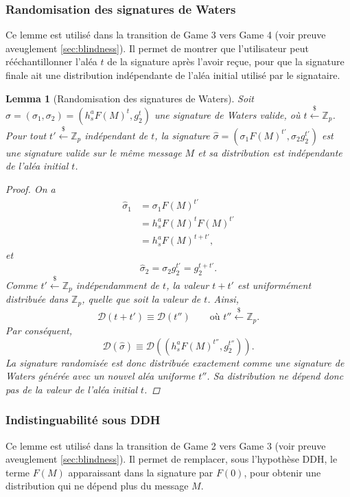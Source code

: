 \documentclass[10pt,a4paper]{article}
\theoremstyle{definition}
\theoremstyle{plain}
\newtheorem{lemma}[definition]{Lemma}
\theoremstyle{remark}
\newcommand{\sample}{\xleftarrow{\$}}
\begin{document}
\subsubsection{Randomisation des signatures de Waters}
Ce lemme est utilisé dans la transition de Game 3 vers Game 4 (voir preuve aveuglement \ref{sec:blindness}). 
Il permet de montrer que l'utilisateur peut rééchantillonner l'aléa $t$ de la signature après l'avoir reçue, 
pour que la signature finale ait une distribution indépendante de l'aléa initial utilisé par le signataire.

\begin{lemma}[Randomisation des signatures de Waters]
\label{lem:randomisation-waters}
Soit
$
\sigma=(\sigma_1,\sigma_2)
=
\left(h_s^a F(M)^t,g_2^t\right)
$
une signature de Waters valide, où $t\sample\mathbb Z_p$.
Pour tout $t'\sample\mathbb Z_p$ indépendant de $t$, la signature
$
\widehat{\sigma}
=
\left(
\sigma_1F(M)^{t'},
\sigma_2g_2^{t'}
\right)
$
est une signature valide sur le même message $M$ et sa distribution
est indépendante de l'aléa initial $t$.

\begin{proof}
On a
\[
\begin{aligned}
\widehat{\sigma}_1
&= \sigma_1F(M)^{t'}\\
&= h_s^aF(M)^tF(M)^{t'}\\
&= h_s^aF(M)^{t+t'},
\end{aligned}
\]
et
\[
\widehat{\sigma}_2
= \sigma_2g_2^{t'}
= g_2^{t+t'}.
\]
Comme $t'\sample\mathbb Z_p$ indépendamment de $t$, la valeur
$t+t'$ est uniformément distribuée dans $\mathbb Z_p$, quelle que soit
la valeur de $t$. Ainsi,
\[
\mathcal{D}(t+t')
\equiv
\mathcal{D}(t'')
\qquad\text{où }t''\sample\mathbb Z_p.
\]
Par conséquent,
\[
\mathcal{D}(\widehat{\sigma})
\equiv
\mathcal{D}\left(
\left(h_s^aF(M)^{t''},g_2^{t''}\right)
\right).
\]
La signature randomisée est donc distribuée exactement comme une
signature de Waters générée avec un nouvel aléa uniforme $t''$.
Sa distribution ne dépend donc pas de la valeur de l'aléa
initial $t$.
\end{proof}
\end{lemma}

\subsubsection{Indistinguabilité sous DDH}

Ce lemme est utilisé dans la transition de Game 2 vers Game 3 (voir preuve aveuglement \ref{sec:blindness}).
Il permet de remplacer, sous l'hypothèse DDH, le terme $F(M)$ apparaissant dans la signature par $F(0)$, 
pour obtenir une distribution qui ne dépend plus du message $M$. 
\end{document}
